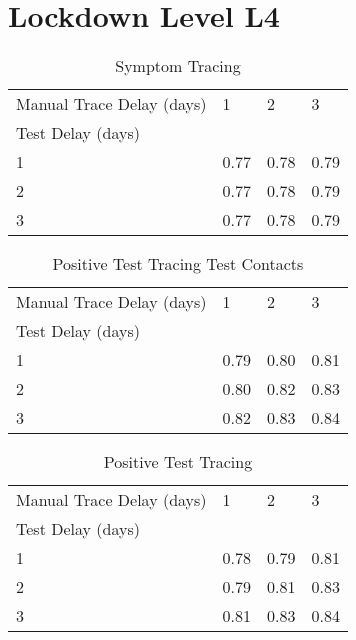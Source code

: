 \documentclass{article}
\begin{document}
\section{Lockdown Level L4}


    \begin{table}[H]
         \begin{tabular}{llll}
\toprule
Manual Trace Delay (days) &     1 &     2 &     3 \\
Test Delay (days) &       &       &       \\
\midrule
1                 &  0.77 &  0.78 &  0.79 \\
2                 &  0.77 &  0.78 &  0.79 \\
3                 &  0.77 &  0.78 &  0.79 \\
\bottomrule
\end{tabular}

        \caption{Symptom Tracing}
    \end{table}
    


    \begin{table}[H]
         \begin{tabular}{llll}
\toprule
Manual Trace Delay (days) &     1 &     2 &     3 \\
Test Delay (days) &       &       &       \\
\midrule
1                 &  0.79 &  0.80 &  0.81 \\
2                 &  0.80 &  0.82 &  0.83 \\
3                 &  0.82 &  0.83 &  0.84 \\
\bottomrule
\end{tabular}

        \caption{Positive Test Tracing Test Contacts}
    \end{table}
    


    \begin{table}[H]
         \begin{tabular}{llll}
\toprule
Manual Trace Delay (days) &     1 &     2 &     3 \\
Test Delay (days) &       &       &       \\
\midrule
1                 &  0.78 &  0.79 &  0.81 \\
2                 &  0.79 &  0.81 &  0.83 \\
3                 &  0.81 &  0.83 &  0.84 \\
\bottomrule
\end{tabular}

        \caption{Positive Test Tracing}
    \end{table}
    
\end{document}
